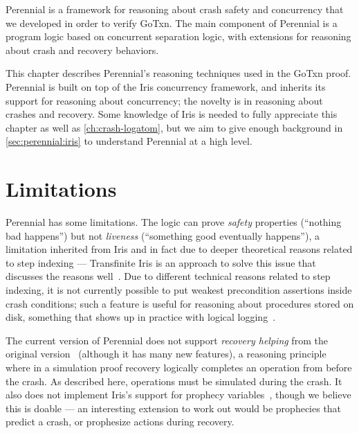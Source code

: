 Perennial is a framework for reasoning about crash safety and concurrency that
we developed in order to verify GoTxn. The main component of Perennial is a
program logic based on concurrent separation logic, with extensions for
reasoning about crash and recovery behaviors.

This chapter describes Perennial's reasoning techniques used in the GoTxn proof.
Perennial is built on top of the Iris concurrency framework, and inherits its
support for reasoning about concurrency; the novelty is in reasoning about
crashes and recovery. Some knowledge of Iris is needed to fully appreciate this
chapter as well as \cref{ch:crash-logatom}, but we aim to give enough background
in \cref{sec:perennial:iris} to understand Perennial at a high level.





\section{Limitations}
\label{sec:perennial:limitations}

Perennial has some limitations. The logic can prove \emph{safety} properties
(``nothing bad happens'') but not \emph{liveness} (``something good eventually
happens''), a limitation inherited from Iris and in fact due to deeper
theoretical reasons related to step indexing --- Transfinite Iris is an approach
to solve this issue that discusses the reasons well~\cite{spies:transfinite}.
Due to different technical reasons related to step indexing, it is not currently
possible to put weakest precondition assertions inside crash conditions; such a
feature is useful for reasoning about procedures stored on disk, something that
shows up in practice with logical logging~\cite{mohan:aries}.

The current version of Perennial does not support \emph{recovery helping} from
the original version~\cite{chajed:perennial} (although it has many new
features), a reasoning principle where in a simulation proof recovery logically
completes an operation from before the crash. As described here, operations must
be simulated during the crash. It also does not implement Iris's support for
prophecy variables~\cite{jung:prophecy}, though we believe this is doable --- an
interesting extension to work out would be prophecies that predict a crash, or
prophesize actions during recovery.

